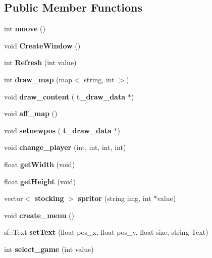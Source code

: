 \subsection*{Public Member Functions}
\begin{DoxyCompactItemize}
\item 
\mbox{\label{classlib___s_f_m_l_aa242f45b507422d38b6c035a5af6a70e}} 
int {\bfseries moove} ()
\item 
\mbox{\label{classlib___s_f_m_l_a6a74341595e2c95fac432826cba68638}} 
void {\bfseries Create\+Window} ()
\item 
\mbox{\label{classlib___s_f_m_l_a41fa6d27f86f434e868036633ba7014c}} 
int {\bfseries Refresh} (int value)
\item 
\mbox{\label{classlib___s_f_m_l_a535179537320718a343bc626bd5077ac}} 
int {\bfseries draw\+\_\+map} (map$<$ string, int $>$)
\item 
\mbox{\label{classlib___s_f_m_l_a07ede9b1aacd2684a925ff0fe964d71e}} 
void {\bfseries draw\+\_\+content} (\textbf{ t\+\_\+draw\+\_\+data} $\ast$)
\item 
\mbox{\label{classlib___s_f_m_l_ad4a960c72e8fb1a180adc562152a1b51}} 
void {\bfseries aff\+\_\+map} ()
\item 
\mbox{\label{classlib___s_f_m_l_a978018ecc1bfd5cf9a8cebe1c89a9914}} 
void {\bfseries setnewpos} (\textbf{ t\+\_\+draw\+\_\+data} $\ast$)
\item 
\mbox{\label{classlib___s_f_m_l_a38ab76530c8700126a8ad66683c137fc}} 
void {\bfseries change\+\_\+player} (int, int, int, int)
\item 
\mbox{\label{classlib___s_f_m_l_a1f1da52733f7a9fb5d9a825c6ff7fe0a}} 
float {\bfseries get\+Width} (void)
\item 
\mbox{\label{classlib___s_f_m_l_a28b33b20c2b137175c34c18c150ffd4f}} 
float {\bfseries get\+Height} (void)
\item 
\mbox{\label{classlib___s_f_m_l_aa9441eadb6bee52c7b77a01ab9b8cca4}} 
vector$<$ \textbf{ stocking} $>$ {\bfseries spritor} (string img, int $\ast$value)
\item 
\mbox{\label{classlib___s_f_m_l_ab68be20253e90707e120349c61f1fda7}} 
void {\bfseries create\+\_\+menu} ()
\item 
\mbox{\label{classlib___s_f_m_l_a941f2c7b6232d89c3716a4e3af1d02c1}} 
sf\+::\+Text {\bfseries set\+Text} (float pos\+\_\+x, float pos\+\_\+y, float size, string Text)
\item 
\mbox{\label{classlib___s_f_m_l_a3d1fbad3f243b1ae9c520836cb9f7607}} 
int {\bfseries select\+\_\+game} (int value)

\end{DoxyCompactItemize}
